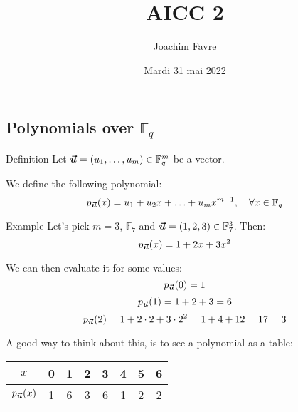 \documentclass[a4paper]{article}
\title{AICC 2}
\author{Joachim Favre}
\date{Mardi 31 mai 2022}
\begin{document}
\maketitle


\subsection{Polynomials over $\mathbb{F}_q$}
\begin{parag}{Definition}
    Let $\bvec{u} = \left(u_1, \ldots, u_m\right) \in \mathbb{F}_q^m$ be a vector. 

    We define the following polynomial: 
    \[p_{\bvec{u}}\left(x\right) = u_1 + u_2 x + \ldots + u_m x^{m-1}, \mathspace \forall x \in \mathbb{F}_q\]
\end{parag}

    
\begin{parag}{Example}
    Let's pick $m = 3$, $\mathbb{F}_7$ and $\bvec{u} = \left(1, 2, 3\right) \in \mathbb{F}_7^3$. Then: 
    \[p_{\bvec{u}}\left(x\right) = 1 + 2x + 3x^2\]

    We can then evaluate it for some values: 
    \[p_{\bvec{u}}\left(0\right) = 1\] 
    \[p_{\bvec{u}}\left(1\right) = 1 + 2 + 3 = 6\] 
    \[p_{\bvec{u}}\left(2\right) = 1 + 2\cdot 2 + 3\cdot 2^2 = 1 + 4 + 12 = 17 = 3\]
    

    A good way to think about this, is to see a polynomial as a table:
    \begin{center}
    \begin{tabular}{c|ccccccc}
        $x$ & 0 & 1 & 2 & 3 & 4 & 5 & 6 \\
        \hline
        $p_{\bvec{u}}\left(x\right)$ & 1 & 6 & 3 & 6 & 1 & 2 & 2
    \end{tabular}
    \end{center}
\end{parag}
\end{document}
